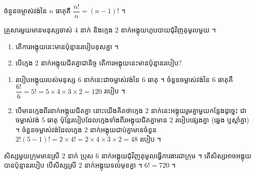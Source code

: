 \begin{formulaBox}[ជាទូទៅ]
ចំនួនចម្លាស់វង់នៃ $n$ ធាតុគឺ $\dfrac{n!}{n} = (n - 1)!$ ។
\end{formulaBox}

\begin{example}[លំហាត់គំរូ]
គ្រួសារមួយមានមនុស្សចាស់ $4$ នាក់ និងក្មេង $2$ នាក់អង្គុយហូបបាយជុំវិញតុមូលមួយ ។
\begin{enumerate}[a]
  \item តើការអង្គុយនេះមានប៉ុន្មានរបៀបខុសគ្នា ។
  \item បើក្មេង $2$ នាក់អង្គុយជិតគ្នាជានិច្ច តើការអង្គុយនេះមានប៉ុន្មានរបៀប?
\end{enumerate}
\end{example}
\ans
\begin{enumerate}[a]
  \item របៀបអង្គុយរបស់មនុស្ស $6$ នាក់នេះជាចម្លាស់វង់នៃ $6$ ធាតុ ។ ចំនួនចម្លាស់វង់នៃ $6$ ធាតុគឺ $\dfrac{6!}{6} = 5! = 5\times 4\times 3\times 2 = 120$ របៀប ។
  \item បើមានក្មេងពីរនាក់អង្គុយជិតគ្នា នោះយើងគិតថាក្មេង $2$ នាក់នេះអង្គុយរួមគ្នាមួយកន្លែងដូច្នេះ ជាចម្លាស់វង់ $5$ ធាតុ ប៉ុន្តែរបៀបដែលក្មេងទាំងពីរអង្គុយជិតគ្នាមាន $2$ របៀបផ្សេងគ្នា (ឆ្វេង ឬស្ដាំគ្នា) ។ ចំនួនចម្លាស់វង់ដែលក្មេង $2$ នាក់អង្គុយជាប់គ្នាមានចំនួន $2!(5 - 1)! = 2\times 4! = 2\times 4\times 3\times 2 = 48$ របៀប ។
\end{enumerate}

\begin{pro}
សិស្សមួយក្រុមមានស្រី $2$ នាក់ ប្រុស $6$ នាក់អង្គុយជុំវិញតុមូលធ្វើការងារជាក្រុម ។ តើសិស្សអាចអង្គុយបានប៉ុន្មានរបៀប បើសិស្សស្រី $2$ នាក់អង្គុយទល់មុខគ្នា ។
\ans
$6! = 720$ ។
\end{pro}

